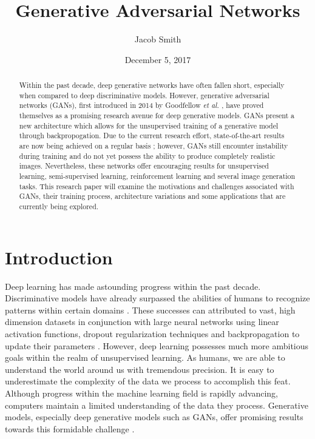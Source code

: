 \documentclass[11pt]{article}
\title{Generative Adversarial Networks}
\author{Jacob Smith}
\date{December 5, 2017}
\begin{document}
\maketitle

\begin{abstract}
    Within the past decade, deep generative networks have often fallen short, especially when compared to deep discriminative models. However, generative adversarial networks (GANs), first introduced in 2014 by Goodfellow \textit{et al.} \citep{2014arXiv1406.2661G}, have proved themselves as a promising research avenue for deep generative models. GANs present a new architecture which allows for the unsupervised training of a generative model through backpropogation. Due to the current research effort, state-of-the-art results are now being achieved on a regular basis \citep{2017arXiv171010196K, 2017arXiv171111585W}; however, GANs still encounter instability during training and do not yet possess the ability to produce completely realistic images. Nevertheless, these networks offer encouraging results for unsupervised learning, semi-supervised learning, reinforcement learning and several image generation tasks. This research paper will examine the motivations and challenges associated with GANs, their training process, architecture variations and some applications that are currently being explored.
\end{abstract}

\section{Introduction}
Deep learning has made astounding progress within the past decade. Discriminative models have already surpassed the abilities of humans to recognize patterns within certain domains \citep{2014arXiv1404.7828S}. These successes can attributed to vast, high dimension datasets in conjunction with large neural networks using linear activation functions, dropout regularization techniques and backpropagation to update their parameters \citep{2014arXiv1406.2661G}. However, deep learning possesses much more ambitious goals within the realm of unsupervised learning. As humans, we are able to understand the world around us with tremendous precision. It is easy to underestimate the complexity of the data we process to accomplish this feat. Although progress within the machine learning field is rapidly advancing, computers maintain a limited understanding of the data they process. Generative models, especially deep generative models such as GANs, offer promising results towards this formidable challenge \citep{genmodelingopenai}.
\end{document}
